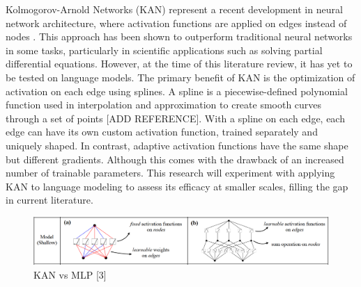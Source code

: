 Kolmogorov-Arnold Networks (KAN) represent a recent development in neural network architecture, where activation functions are applied on edges instead of nodes \cite{Liu2024}. This approach has been shown to outperform traditional neural networks in some tasks, particularly in scientific applications such as solving partial differential equations. However, at the time of this literature review, it has yet to be tested on language models. The primary benefit of KAN is the optimization of activation on each edge using splines. A spline is a piecewise-defined polynomial function used in interpolation and approximation to create smooth curves through a set of points [ADD REFERENCE]. With a spline on each edge, each edge can have its own custom activation function, trained separately and uniquely shaped. In contrast, adaptive activation functions have the same shape but different gradients. Although this comes with the drawback of an increased number of trainable parameters. This research will experiment with applying KAN to language modeling to assess its efficacy at smaller scales, filling the gap in current literature.
\clearpage
\vspace*{\fill}
\begin{figure}[hb]
    \centering
    \includegraphics[width=\columnwidth * 2]{figures/kan-network.png}
    \caption{KAN vs MLP [3]}
    \label{fig:your-label}
\end{figure}
\vspace*{\fill}

\clearpage
